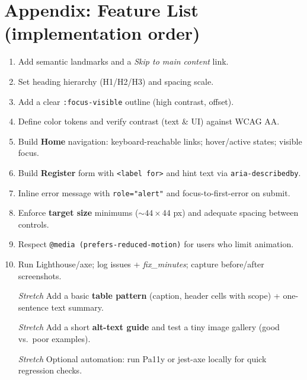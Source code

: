 \documentclass[12pt]{article}
\begin{document}
\section*{Appendix: Feature List (implementation order)}
\begin{enumerate}
  \item Add semantic landmarks and a \emph{Skip to main content} link.
  \item Set heading hierarchy (H1/H2/H3) and spacing scale.
  \item Add a clear \texttt{:focus-visible} outline (high contrast, offset).
  \item Define color tokens and verify contrast (text \& UI) against WCAG AA.
  \item Build \textbf{Home} navigation: keyboard-reachable links; hover/active states; visible focus.
  \item Build \textbf{Register} form with \texttt{<label for>} and hint text via \texttt{aria-describedby}.
  \item Inline error message with \texttt{role="alert"} and focus-to-first-error on submit.
  \item Enforce \textbf{target size} minimums ($\sim 44\times 44$ px) and adequate spacing between controls.
  \item Respect \texttt{@media (prefers-reduced-motion)} for users who limit animation.
  \item Run Lighthouse/axe; log issues + \emph{fix\_minutes}; capture before/after screenshots.
  \item[\textit{Stretch}] Add a basic \textbf{table pattern} (caption, header cells with scope) + one-sentence text summary.
  \item[\textit{Stretch}] Add a short \textbf{alt-text guide} and test a tiny image gallery (good vs.\ poor examples).
  \item[\textit{Stretch}] Optional automation: run Pa11y or jest-axe locally for quick regression checks.
\end{enumerate}
\end{document}
